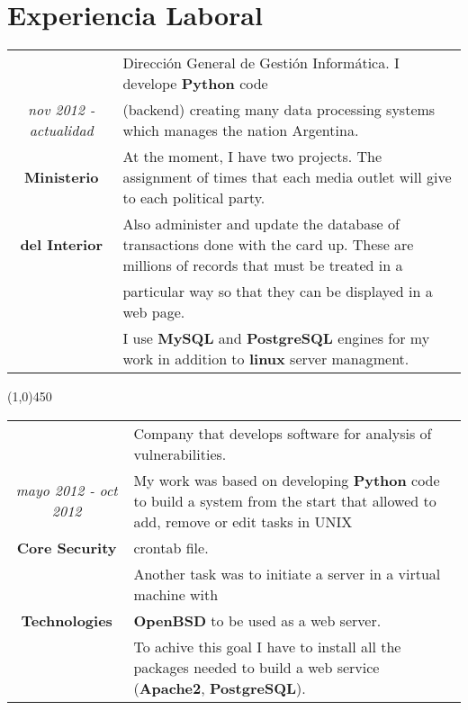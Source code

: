 \section{Experiencia Laboral}

\begin{tabular}{c|p{12.5cm}}
& \large Dirección General de Gestión Informática. I develope \textbf{Python} code\\
\large\textit{nov 2012 - actualidad} &  \large  (backend) creating many data processing systems which manages the nation Argentina.\\
\large\textbf{Ministerio} & \large  At the moment, I have two projects. The assignment of times that each media outlet will give to each political party.\\
\large\textbf{del Interior} & \large Also administer and update the database of transactions done with the card up. These are millions of records that must be treated in a \\
& \large particular way so that they can be displayed in a web page.\\
& \large I use \textbf{MySQL} and \textbf{PostgreSQL} engines for my work in addition to \textbf{linux} server managment.\\
\end{tabular}

\begin{center}
\line(1,0){450}
\end{center}
\begin{tabular}{c|p{12.5cm}}
& \large Company that develops software for analysis of vulnerabilities.\\
\large\textit{mayo 2012 - oct 2012} &  \large My work was based on developing \textbf{Python} code to build a system from the start that allowed to add, remove or edit tasks in UNIX\\
\large\textbf{Core Security} & \large  crontab file.\\
 & \large  Another task was to initiate a server in a virtual machine with \\
\large\textbf{Technologies} & \large\textbf{OpenBSD} to be used as a web server. \\
& \large To achive this goal I have to install all the packages needed to build a web service (\textbf{Apache2}, \textbf{PostgreSQL}). \\
\end{tabular}

